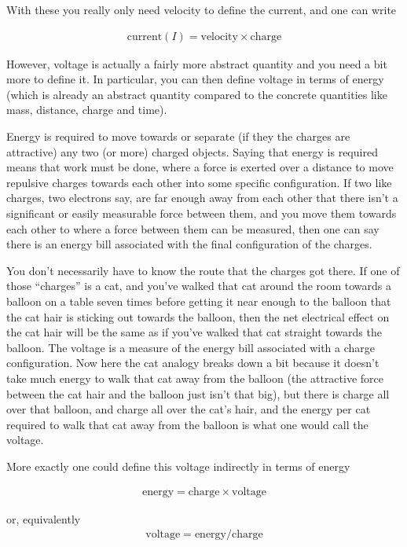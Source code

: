 With these you really only need velocity to define the current, and one can write

\begin{align*}
\text{current} (I) = \text{velocity} \times \text{charge}
\end{align*}

However, voltage is actually a fairly more abstract quantity and you need a bit more to define it.
In particular, you can then define voltage in terms of energy (which is already an abstract quantity compared to
the concrete quantities like mass, distance, charge and time).

Energy is required 
to move towards or separate (if they the charges are attractive) any two (or more) charged objects.
Saying that energy is required means that work must be done, where a force is exerted over a distance to move repulsive
charges towards each other into some specific configuration.  If two like charges, two electrons say, are far enough away
from each other that there isn't a significant or easily measurable force between them, and you move them towards each other
to where a force between them can be measured, then one can say there is an energy bill associated with the final configuration
of the charges.

You don't necessarily have to know the route that the charges got there.  If one of those ``charges'' is a
cat, and you've walked that cat around the room towards a balloon on a table seven times before getting it near enough 
to the balloon that the cat hair is sticking out towards the balloon, then the net electrical effect on the cat hair will 
be the same as if you've walked that cat straight towards the balloon.  The voltage is a measure of the energy bill associated
with a charge configuration.  Now here the cat analogy breaks down a bit because it doesn't take much energy to walk that cat
away from the balloon (the attractive force between the cat hair and the balloon just isn't that big), but there is charge
all over that balloon, and charge all over the cat's hair, and the energy per cat required to walk that cat away from the balloon
is what one would call the voltage.

More exactly one could define this voltage indirectly in terms of energy

\begin{align*}
\text{energy} = \text{charge} \times \text{voltage}
\end{align*}

or, equivalently
\begin{align*}
\text{voltage} = \text{energy} / \text{charge}
\end{align*}

